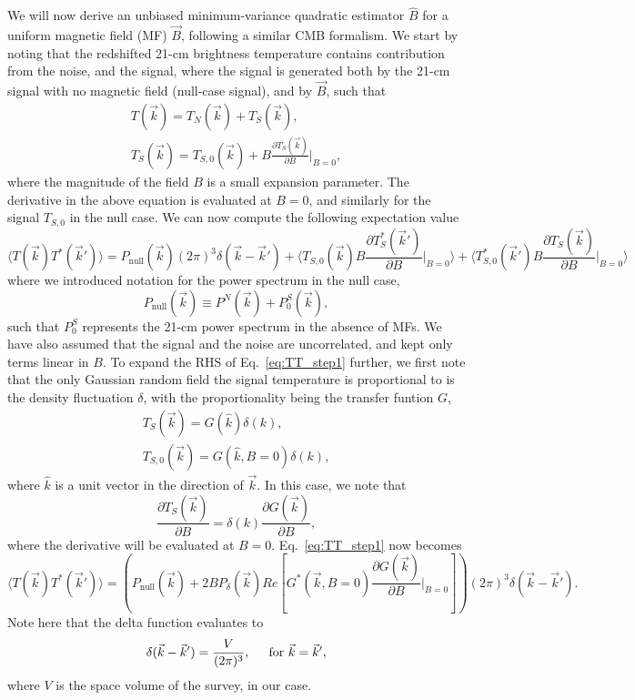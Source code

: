 \documentclass[12pt]{paper}
\newcommand{\beq}{\begin{equation}}
\newcommand{\eeq}{\end{equation}}
\newcommand{\bga}{\begin{gathered}}
\newcommand{\ega}{\end{gathered}}
\begin{document}
We will now derive an unbiased minimum-variance quadratic estimator $\widehat B$ for a uniform magnetic field (MF) $\vec B$, following a similar CMB formalism. We start by noting that the redshifted 21-cm brightness temperature contains contribution from the noise, and the signal, where the signal is generated both by the 21-cm signal with no magnetic field (null-case signal), and by $\vec B$, such that
\beq
\bga
T(\vec k) = T_N(\vec k) + T_S(\vec k),\\
T_S(\vec k) = T_{S,0}(\vec k) + B\frac{\partial T_S(\vec k)}{\partial B}\bigg|_{B=0},
\ega
\label{eq:Ttot}
\eeq
where the magnitude of the field $B$ is a small expansion parameter. The derivative in the above equation is evaluated at $B=0$, and similarly for the signal $T_{S,0}$ in the null case.  We can now compute the following expectation value
\beq
\langle T(\vec k)T^*(\vec k')\rangle = P_\text{null}(\vec k)(2\pi)^3\delta(\vec k-\vec k') + \langle T_{S,0}(\vec k)B\frac{\partial T_S^*(\vec k')}{\partial B}\bigg|_{B=0}\rangle + \langle T_{S,0}^*(\vec k')B\frac{\partial T_S(\vec k)}{\partial B}\bigg|_{B=0}\rangle
\label{eq:TT_step1}
\eeq
where we introduced notation for the power spectrum in the null case,
\beq
P_\text{null}(\vec k) \equiv P^N(\vec k) + P_0^S(\vec k),
\label{eq:Pnull}
\eeq
such that $P^S_0$ represents the 21-cm power spectrum in the absence of MFs. We have also assumed that the signal and the noise are uncorrelated, and kept only terms linear in $B$. To expand the RHS of Eq.~\ref{eq:TT_step1} further, we first note that the only Gaussian random field the signal temperature is proportional to is the density fluctuation $\delta$, with the proportionality being the transfer funtion $G$,
\beq
\bga
T_S(\vec k) = G(\hat k)\delta(k),\\
T_{S,0}(\vec k) = G(\hat k,B=0)\delta(k),
\ega
\label{eq:def_G}
\eeq
where $\hat k$ is a unit vector in the direction of $\vec k$. In this case, we note that
\beq
\frac{\partial T_S(\vec k)}{\partial B} =  \delta(k)\frac{\partial G(\vec k)}{\partial B},
\label{eq:dTdB_dGdB}
\eeq
where the derivative will be evaluated at $B=0$. Eq.~\ref{eq:TT_step1} now becomes
\beq
\langle T(\vec k)T^*(\vec k')\rangle = \left(P_\text{null}(\vec k) + 2BP_{\delta}(\vec k)Re\left[G^*(\vec k,B=0)\frac{\partial G(\vec k)}{\partial B}\bigg|_{B=0}\right]\right) (2\pi)^3\delta(\vec k-\vec k').
\label{eq:TT_step2}
\eeq
Note here that the delta function evaluates to
\beq
\delta(\vec k-\vec k') = \frac{V}{(2\pi)^3},\hspace{0.2in} \text{for }\vec k = \vec k',
\label{eq:delta_kk}
\eeq
where $V$ is the space volume of the survey, in our case. 
\end{document}

